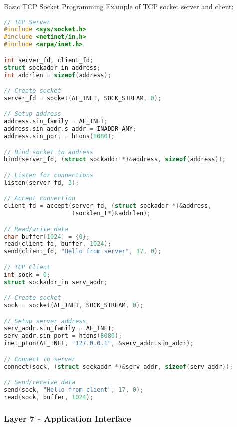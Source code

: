 \begin{code}{Basic TCP Socket Programming}
    Example of TCP socket server and client:
    
\begin{lstlisting}[language=C, style=basesmol]
// TCP Server
#include <sys/socket.h>
#include <netinet/in.h>
#include <arpa/inet.h>

int server_fd, client_fd;
struct sockaddr_in address;
int addrlen = sizeof(address);

// Create socket
server_fd = socket(AF_INET, SOCK_STREAM, 0);

// Setup address
address.sin_family = AF_INET;
address.sin_addr.s_addr = INADDR_ANY;
address.sin_port = htons(8080);

// Bind socket to address
bind(server_fd, (struct sockaddr *)&address, sizeof(address));

// Listen for connections
listen(server_fd, 3);

// Accept connection
client_fd = accept(server_fd, (struct sockaddr *)&address, 
                   (socklen_t*)&addrlen);

// Read/write data
char buffer[1024] = {0};
read(client_fd, buffer, 1024);
send(client_fd, "Hello from server", 17, 0);

// TCP Client
int sock = 0;
struct sockaddr_in serv_addr;

// Create socket
sock = socket(AF_INET, SOCK_STREAM, 0);

// Setup server address
serv_addr.sin_family = AF_INET;
serv_addr.sin_port = htons(8080);
inet_pton(AF_INET, "127.0.0.1", &serv_addr.sin_addr);

// Connect to server
connect(sock, (struct sockaddr *)&serv_addr, sizeof(serv_addr));

// Send/receive data
send(sock, "Hello from client", 17, 0);
read(sock, buffer, 1024);
\end{lstlisting}
\end{code}


\subsubsection{Layer 7 - Application Interface}



